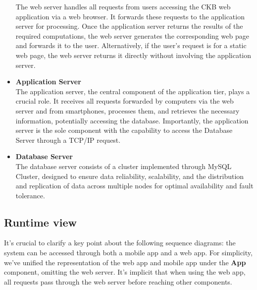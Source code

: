 \documentclass{article}
\begin{document}
\begin{itemize}
    The web server handles all requests from users accessing the CKB web application via a web browser. It forwards these requests to the application server for processing. Once the application server returns the results of the required computations, the web server generates the corresponding web page and forwards it to the user. Alternatively, if the user's request is for a static web page, the web server returns it directly without involving the application server.
    \item \textbf{Application Server} \\
    The application server, the central component of the application tier, plays a crucial role. It receives all requests forwarded by computers via the web server and from smartphones, processes them, and retrieves the necessary information, potentially accessing the database. Importantly, the application server is the sole component with the capability to access the Database Server through a TCP/IP request.
    \item \textbf{Database Server} \\
    The database server consists of a cluster implemented through MySQL Cluster, designed to ensure data reliability, scalability, and the distribution and replication of data across multiple nodes for optimal availability and fault tolerance.
\end{itemize}
\newpage
\subsection{Runtime view}
It's crucial to clarify a key point about the following sequence diagrams: the system can be accessed through both a mobile app and a web app. For simplicity, we've unified the representation of the web app and mobile app under the \textbf{App} component, omitting the web server. It's implicit that when using the web app, all requests pass through the web server before reaching other components.
\end{document}
